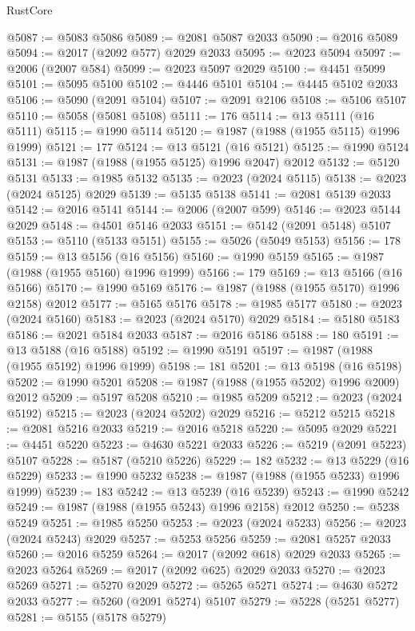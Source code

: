 \begin{lexlean}{RustCore}
\begin{coremodule}
@5087 := @5083 @5086
@5089 := @2081 @5087 @2033
@5090 := @2016 @5089
@5094 := @2017 (@2092 @577) @2029 @2033
@5095 := @2023 @5094
@5097 := @2006 (@2007 @584)
@5099 := @2023 @5097 @2029
@5100 := @4451 @5099
@5101 := @5095 @5100
@5102 := @4446 @5101
@5104 := @4445 @5102 @2033
@5106 := @5090 (@2091 @5104)
@5107 := @2091 @2106
@5108 := @5106 @5107
@5110 := @5058 (@5081 @5108)
@5111 := 176
@5114 := @13 @5111 (@16 @5111)
@5115 := @1990 @5114
@5120 := @1987 (@1988 (@1955 @5115) @1996 @1999)
@5121 := 177
@5124 := @13 @5121 (@16 @5121)
@5125 := @1990 @5124
@5131 := @1987 (@1988 (@1955 @5125) @1996 @2047) @2012
@5132 := @5120 @5131
@5133 := @1985 @5132
@5135 := @2023 (@2024 @5115)
@5138 := @2023 (@2024 @5125) @2029
@5139 := @5135 @5138
@5141 := @2081 @5139 @2033
@5142 := @2016 @5141
@5144 := @2006 (@2007 @599)
@5146 := @2023 @5144 @2029
@5148 := @4501 @5146 @2033
@5151 := @5142 (@2091 @5148) @5107
@5153 := @5110 (@5133 @5151)
@5155 := @5026 (@5049 @5153)
@5156 := 178
@5159 := @13 @5156 (@16 @5156)
@5160 := @1990 @5159
@5165 := @1987 (@1988 (@1955 @5160) @1996 @1999)
@5166 := 179
@5169 := @13 @5166 (@16 @5166)
@5170 := @1990 @5169
@5176 := @1987 (@1988 (@1955 @5170) @1996 @2158) @2012
@5177 := @5165 @5176
@5178 := @1985 @5177
@5180 := @2023 (@2024 @5160)
@5183 := @2023 (@2024 @5170) @2029
@5184 := @5180 @5183
@5186 := @2021 @5184 @2033
@5187 := @2016 @5186
@5188 := 180
@5191 := @13 @5188 (@16 @5188)
@5192 := @1990 @5191
@5197 := @1987 (@1988 (@1955 @5192) @1996 @1999)
@5198 := 181
@5201 := @13 @5198 (@16 @5198)
@5202 := @1990 @5201
@5208 := @1987 (@1988 (@1955 @5202) @1996 @2009) @2012
@5209 := @5197 @5208
@5210 := @1985 @5209
@5212 := @2023 (@2024 @5192)
@5215 := @2023 (@2024 @5202) @2029
@5216 := @5212 @5215
@5218 := @2081 @5216 @2033
@5219 := @2016 @5218
@5220 := @5095 @2029
@5221 := @4451 @5220
@5223 := @4630 @5221 @2033
@5226 := @5219 (@2091 @5223) @5107
@5228 := @5187 (@5210 @5226)
@5229 := 182
@5232 := @13 @5229 (@16 @5229)
@5233 := @1990 @5232
@5238 := @1987 (@1988 (@1955 @5233) @1996 @1999)
@5239 := 183
@5242 := @13 @5239 (@16 @5239)
@5243 := @1990 @5242
@5249 := @1987 (@1988 (@1955 @5243) @1996 @2158) @2012
@5250 := @5238 @5249
@5251 := @1985 @5250
@5253 := @2023 (@2024 @5233)
@5256 := @2023 (@2024 @5243) @2029
@5257 := @5253 @5256
@5259 := @2081 @5257 @2033
@5260 := @2016 @5259
@5264 := @2017 (@2092 @618) @2029 @2033
@5265 := @2023 @5264
@5269 := @2017 (@2092 @625) @2029 @2033
@5270 := @2023 @5269
@5271 := @5270 @2029
@5272 := @5265 @5271
@5274 := @4630 @5272 @2033
@5277 := @5260 (@2091 @5274) @5107
@5279 := @5228 (@5251 @5277)
@5281 := @5155 (@5178 @5279)

\end{coremodule}
\end{lexlean}
